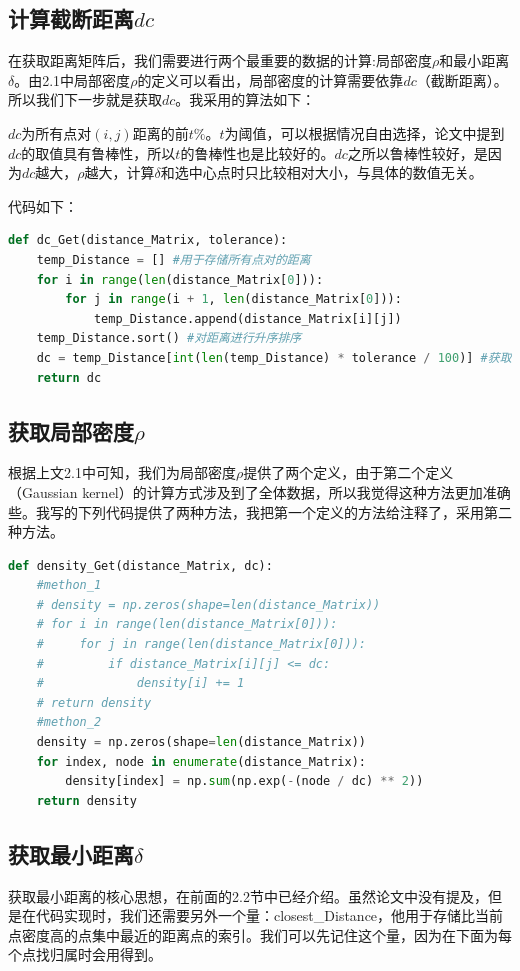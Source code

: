 \subsection{计算截断距离$dc$}

在获取距离矩阵后，我们需要进行两个最重要的数据的计算:局部密度$\rho$和最小距离$\delta$。由2.1中局部密度$\rho$的定义可以看出，局部密度的计算需要依靠$dc$（截断距离）。所以我们下一步就是获取$dc$。我采用的算法如下：

$dc$为所有点对$(i,j)$距离的前$t\%$。$t$为阈值，可以根据情况自由选择，论文中提到$dc$的取值具有鲁棒性，所以$t$的鲁棒性也是比较好的。$dc$之所以鲁棒性较好，是因为$dc$越大，$\rho$越大，计算$\delta$和选中心点时只比较相对大小，与具体的数值无关。

代码如下：

\begin{lstlisting}[language=python]
def dc_Get(distance_Matrix, tolerance):
    temp_Distance = [] #用于存储所有点对的距离
    for i in range(len(distance_Matrix[0])):
        for j in range(i + 1, len(distance_Matrix[0])):
            temp_Distance.append(distance_Matrix[i][j])
    temp_Distance.sort() #对距离进行升序排序
    dc = temp_Distance[int(len(temp_Distance) * tolerance / 100)] #获取第tolerance%的点对距离作为截断距离
    return dc
\end{lstlisting}


\subsection{获取局部密度$\rho$}
根据上文2.1中可知，我们为局部密度$\rho$提供了两个定义，由于第二个定义（Gaussian kernel）的计算方式涉及到了全体数据，所以我觉得这种方法更加准确些。我写的下列代码提供了两种方法，我把第一个定义的方法给注释了，采用第二种方法。

\begin{lstlisting}[language=python]
def density_Get(distance_Matrix, dc):
    #methon_1
    # density = np.zeros(shape=len(distance_Matrix))
    # for i in range(len(distance_Matrix[0])):
    #     for j in range(len(distance_Matrix[0])):
    #         if distance_Matrix[i][j] <= dc:
    #             density[i] += 1
    # return density
    #methon_2
    density = np.zeros(shape=len(distance_Matrix))
    for index, node in enumerate(distance_Matrix):
        density[index] = np.sum(np.exp(-(node / dc) ** 2))
    return density
\end{lstlisting}


\subsection{获取最小距离$\delta$}
获取最小距离的核心思想，在前面的2.2节中已经介绍。虽然论文中没有提及，但是在代码实现时，我们还需要另外一个量：closest\_Distance，他用于存储比当前点密度高的点集中最近的距离点的索引。我们可以先记住这个量，因为在下面为每个点找归属时会用得到。


